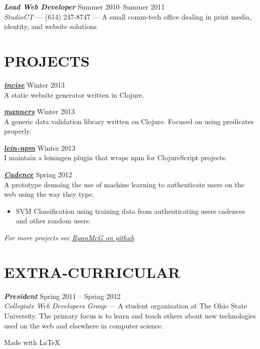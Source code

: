 \documentclass[line,letterpaper]{resume}
\begin{document}
\begin{resume}
    {\sl\textbf{Lead Web Developer}} \hfill Summer 2010--Summer 2011\\
    \emph{StudioCT} --- (614) 247-8747 --- A small comm-tech office dealing
    in print media, identity, and website solutions
    \vspace{-6pt}


    \section{\uppercase{Projects}}

    {\sl\textbf{\underline{\href{https://github.com/RyanMcG/incise}{incise}}}}
    \hfill Winter 2013\\
    A static website generator written in Clojure.
    \vspace{-6pt}

    {\sl\textbf{\underline{\href{https://github.com/RyanMcG/manners}{manners}}}}
    \hfill Winter 2013\\
    A generic data validation library written on Clojure.
    Focused on using predicates properly.
    \vspace{-6pt}

    {\sl\textbf{\underline{\href{https://github.com/RyanMcG/lein-npm}{lein-npm}}}}
    \hfill Winter 2013\\
    I maintain a leiningen plugin that wraps npm for ClojureScript projects.
    \vspace{-6pt}

    {\sl\textbf{\underline{\href{https://github.com/RyanMcG/Cadence}{Cadence}}}}
    \hfill Spring 2012\\
    A prototype demoing the use of machine learning to authenticate users on the
    web using the way they type.
    \begin{itemize}
        \item SVM Classification using training data from authenticating users
            cadences and other random users.
    \end{itemize}
    \vspace{-6pt}

    \vspace{-3pt}
    \hfill \emph{For more projects see
    \underline{\href{https://github.com/RyanMcG}{RyanMcG on github}}}.

    \vspace{-15pt}

    \section{\uppercase{Extra-Curricular}}
    {\sl\textbf{President}} \hfill Spring 2011 -- Spring 2012\\
    \emph{Collegiate Web Developers Group} --- A student organization at The
    Ohio State University. The primary focus is to learn and teach others about
    new technologies used on the web and elsewhere in computer science.

\end{resume}

\vspace{16pt}

\hfill Made with \LaTeX{}
\end{document}
